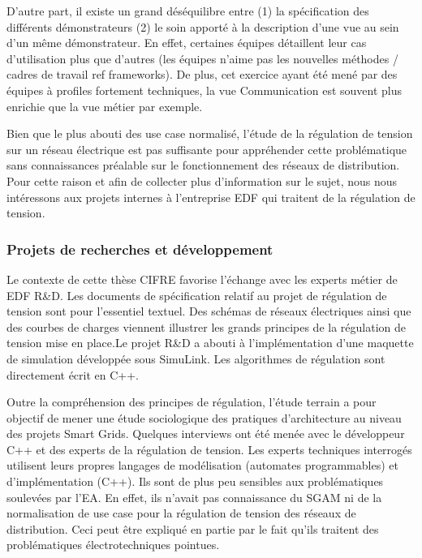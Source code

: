 D'autre part, il existe un grand déséquilibre entre (1) la spécification des 
différents démonstrateurs (2) le soin apporté à la description d'une vue au sein 
d'un même démonstrateur. En effet, certaines équipes détaillent leur cas 
d'utilisation plus que d'autres (les équipes n'aime pas les nouvelles méthodes / 
cadres de travail ref frameworks).  De plus, cet exercice ayant été mené par des 
équipes à profiles fortement techniques, la vue Communication est souvent plus 
enrichie que la vue métier par exemple.  

Bien que le plus abouti des use case normalisé, l'étude de la régulation de 
tension sur un  réseau électrique est pas suffisante pour appréhender cette 
problématique sans connaissances préalable sur le fonctionnement des réseaux de 
distribution. Pour cette raison et afin de collecter plus d'information sur le 
sujet, nous nous intéressons aux projets internes à l'entreprise EDF qui 
traitent de la régulation de tension.
 

\subsubsection{Projets de recherches et développement}

Le contexte de cette thèse CIFRE favorise l'échange avec les experts métier de 
EDF R\&D. Les documents de spécification relatif au projet de régulation de 
tension sont pour l'essentiel textuel. Des schémas de réseaux électriques ainsi 
que des courbes de charges viennent illustrer les grands principes de la 
régulation de tension mise en place.Le projet R\&D a abouti à l'implémentation 
d'une maquette de simulation 
développée sous SimuLink. Les algorithmes de régulation sont directement écrit 
en C++. 

Outre la compréhension des principes de régulation, l'étude terrain a pour 
objectif de mener une étude sociologique des pratiques d'architecture au niveau 
des projets Smart Grids. Quelques interviews ont été menée avec le développeur 
C++  et des experts de la régulation de tension. Les experts techniques 
interrogés utilisent leurs propres langages de modélisation (automates 
programmables) et d'implémentation (C++). Ils sont de plus peu sensibles aux 
problématiques soulevées par l'EA. En effet, ils n'avait pas connaissance du 
SGAM ni de la normalisation de use case pour la régulation de tension des 
réseaux de distribution. Ceci peut être expliqué en partie par le fait qu'ils 
traitent des problématiques électrotechniques pointues. 

